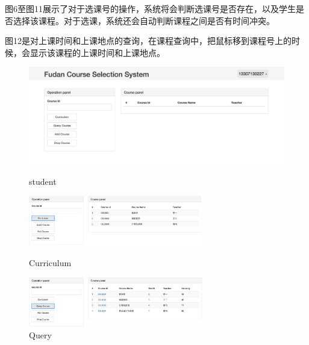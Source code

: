 \documentclass[a4paper, 11pt, nofonts, nocap, fancyhdr]{ctexart}
\begin{document}
	图6至图11展示了对于选课号的操作，系统将会判断选课号是否存在，以及学生是否选择该课程。对于选课，系统还会自动判断课程之间是否有时间冲突。

	图12是对上课时间和上课地点的查询，在课程查询中，把鼠标移到课程号上的时候，会显示该课程的上课时间和上课地点。

	
	\begin{figure}[ht]

		\centering
		\includegraphics[width=6in]{student}
		\caption{student}

		\vspace{0.8cm}

		\begin{minipage}{0.5\textwidth}
			\centering
			\includegraphics[width=3in]{curriculum}
			\caption{Curriculum}
		\end{minipage}%
		\begin{minipage}{0.5\textwidth}
			\centering
			\includegraphics[width=3in]{query}
			\caption{Query}
		\end{minipage}
	\end{figure}
	\vspace{0.8cm}
\end{document}
